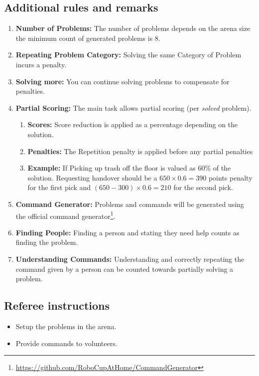 \subsection*{Additional rules and remarks}
\begin{enumerate}[nosep]
	\item \textbf{Number of Problems:} The number of problems depends on the arena size the minimum count of generated problems is 8.
	\item \textbf{Repeating Problem Category:} Solving the same Category of Problem incurs a penalty. 
	\item \textbf{Solving more:} You can continue solving problems to compensate for penalties.
	\item \textbf{Partial Scoring:} The main task allows partial scoring (per \emph{solved} problem).
	\begin{enumerate}[nosep]
		\item \textbf{Scores:} Score reduction is applied as a percentage depending on the solution.
		\item \textbf{Penalties:} The Repetition penalty is applied before any partial penalties
		\item \textbf{Example:} If Picking up trash off the floor is valued as 60\% of the solution. Requesting handover should be a $ 650 \times 0.6 = 390 $ points penalty for the first pick and  $ \left( 650 - 300 \right) \times 0.6 = 210 $ for the second pick.
	\end{enumerate}
	\item \textbf{Command Generator:} Problems and commands will be generated using the official command generator\footnote{\url{https://github.com/RoboCupAtHome/CommandGenerator}}.
	\item \textbf{Finding People:} Finding a person and stating they need help counts as finding the problem.
	\item \textbf{Understanding Commands:} Understanding and correctly repeating the command given by a person can be counted towards partially solving a problem.
\end{enumerate}

\subsection*{Referee instructions}
\begin{itemize}
	\item Setup the problems in the arena.
	\item Provide commands to volunteers.
\end{itemize}


